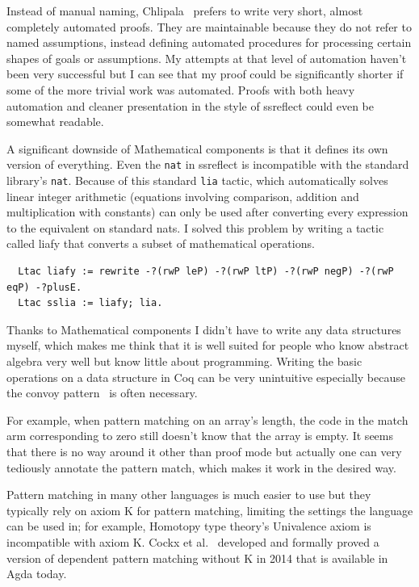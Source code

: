 \documentclass[english, 12pt, a4paper, sci, a-1b, online]{aaltothesis}
\newcommand\icoq[1]{\texttt{#1}}
\begin{document}
Instead of manual naming, Chlipala~\cite{CPDT} prefers to write very short, almost completely automated proofs. They are maintainable because they do not refer to named assumptions, instead defining automated procedures for processing certain shapes of goals or assumptions. My attempts at that level of automation haven't been very successful but I can see that my proof could be significantly shorter if some of the more trivial work was automated. Proofs with both heavy automation and cleaner presentation in the style of ssreflect could even be somewhat readable.

A significant downside of Mathematical components is that it defines its own version of everything. Even the \icoq{nat} in ssreflect is incompatible with the standard library's \icoq{nat}. Because of this standard \icoq{lia} tactic, which automatically solves linear integer arithmetic (equations involving comparison, addition and multiplication with constants) can only be used after converting every expression to the equivalent on standard nats. I solved this problem by writing a tactic called liafy that converts a subset of mathematical operations.

\begin{verbatim}
  Ltac liafy := rewrite -?(rwP leP) -?(rwP ltP) -?(rwP negP) -?(rwP eqP) -?plusE.
  Ltac sslia := liafy; lia.
\end{verbatim}

Thanks to Mathematical components I didn't have to write any data structures myself, which makes me think that it is well suited for people who know abstract algebra very well but know little about programming. Writing the basic operations on a data structure in Coq can be very unintuitive especially because the convoy pattern~\cite{CPDT} is often necessary.

For example, when pattern matching on an array's length, the code in the match arm corresponding to zero still doesn't know that the array is empty. It seems that there is no way around it other than proof mode but actually one can very tediously annotate the pattern match, which makes it work in the desired way.

Pattern matching in many other languages is much easier to use but they typically rely on axiom K for pattern matching, limiting the settings the language can be used in; for example, Homotopy type theory's Univalence axiom is incompatible with axiom K. Cockx et al.~\cite{withoutK} developed and formally proved a version of dependent pattern matching without K in 2014 that is available in Agda today.
\end{document}
